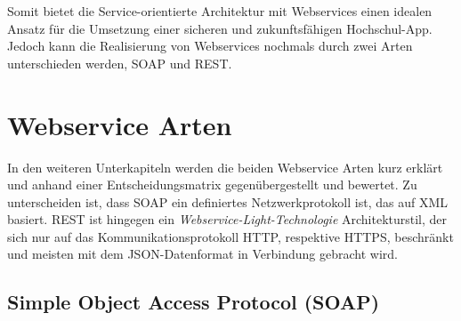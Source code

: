 Somit bietet die Service-orientierte Architektur mit Webservices einen idealen Ansatz für die Umsetzung einer sicheren und zukunftsfähigen Hochschul-\ac{App}. Jedoch kann die Realisierung von Webservices nochmals durch zwei Arten unterschieden werden, \ac{SOAP} und \ac{REST}.


\section{Webservice Arten}
In den weiteren Unterkapiteln werden die beiden Webservice Arten kurz erklärt und anhand einer Entscheidungsmatrix gegenübergestellt und bewertet. Zu unterscheiden ist, dass \ac{SOAP} ein definiertes Netzwerkprotokoll ist, das auf \ac{XML} basiert. \ac{REST} ist hingegen ein \textit{Webservice-Light-Technologie} Architekturstil, der sich nur auf das Kommunikationsprotokoll \ac{HTTP}, respektive \ac{HTTPS}, beschränkt und meisten mit dem \ac{JSON}-Datenformat in Verbindung gebracht wird\autocite[Vgl.][23\psqq]{jws}.

\subsection{Simple Object Access Protocol (SOAP)}

